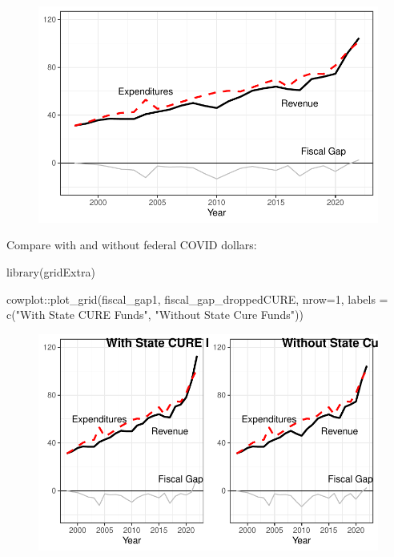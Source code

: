 \documentclass[
  letterpaper,
  DIV=11,
  numbers=noendperiod]{scrreport}
\newenvironment{Shaded}{\begin{snugshade}}{\end{snugshade}}
\newcommand{\AttributeTok}[1]{\textcolor[rgb]{0.40,0.45,0.13}{#1}}
\newcommand{\DecValTok}[1]{\textcolor[rgb]{0.68,0.00,0.00}{#1}}
\newcommand{\FunctionTok}[1]{\textcolor[rgb]{0.28,0.35,0.67}{#1}}
\newcommand{\NormalTok}[1]{\textcolor[rgb]{0.00,0.23,0.31}{#1}}
\newcommand{\SpecialCharTok}[1]{\textcolor[rgb]{0.37,0.37,0.37}{#1}}
\newcommand{\StringTok}[1]{\textcolor[rgb]{0.13,0.47,0.30}{#1}}
\begin{document}
\begin{figure}[H]

{\centering \includegraphics{./Everything_files/figure-pdf/unnamed-chunk-25-2.pdf}

}

\end{figure}

Compare with and without federal COVID dollars:

\begin{Shaded}
\begin{Highlighting}[]
\FunctionTok{library}\NormalTok{(gridExtra)}

\NormalTok{cowplot}\SpecialCharTok{::}\FunctionTok{plot\_grid}\NormalTok{(fiscal\_gap1,}
\NormalTok{                   fiscal\_gap\_droppedCURE, }\AttributeTok{nrow=}\DecValTok{1}\NormalTok{, }\AttributeTok{labels =} \FunctionTok{c}\NormalTok{(}\StringTok{"With State CURE Funds"}\NormalTok{, }\StringTok{"Without State Cure Funds"}\NormalTok{))}
\end{Highlighting}
\end{Shaded}

\begin{figure}[H]

{\centering \includegraphics{./Everything_files/figure-pdf/unnamed-chunk-26-1.pdf}

}

\end{figure}
\end{document}
